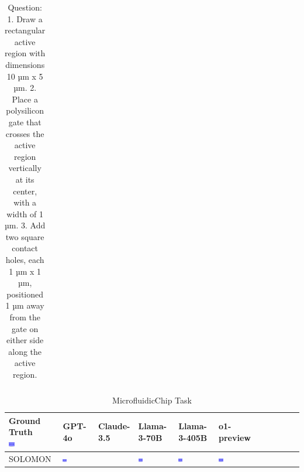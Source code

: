 \begin{table}
\begin{tabular}{@{}mmmmmm@{}}
    \bottomrule
  \end{tabular}
  \caption*{Question: 1. Draw a rectangular active region with dimensions 10 µm x 5 µm.
2. Place a polysilicon gate that crosses the active region vertically at its center, with a width of 1 µm.
3. Add two square contact holes, each 1 µm x 1 µm, positioned 1 µm away from the gate on either side along the active region.}
\end{table}

\begin{table}
  \caption{MicrofluidicChip Task}
  \label{table:microfluidicchip}
  \centering
  \begin{tabular}{@{}mmmmmm@{}}
    \toprule
    \makecell{Ground Truth \\ \includegraphics[width=0.13\textwidth]{examples_png/MicrofluidicChip.png}} & GPT-4o & Claude-3.5 & Llama-3-70B & Llama-3-405B & o1-preview \\
    \midrule
    SOLOMON & \includegraphics[width=0.13\textwidth]{./pool_all/png/gpt-4o_results/MicrofluidicChip.png} &  & \includegraphics[width=0.13\textwidth]{./pool_all/png/claude-3-5-sonnet-20240620_results/MicrofluidicChip.png} & \includegraphics[width=0.13\textwidth]{./pool_all/png/watsonx_meta-llama_llama-3-1-70b-instruct_results/MicrofluidicChip.png} & \includegraphics[width=0.13\textwidth]{./pool_all/png/watsonx_meta-llama_llama-3-405b-instruct_results/MicrofluidicChip.png} \\

\end{tabular}
\end{table}
